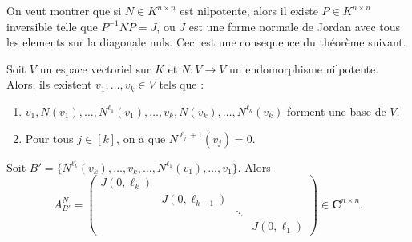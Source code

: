On veut montrer que si $N\in K^{n\times n}$ est nilpotente, alors il existe $P\in K^{n\times n}$ inversible telle que $P^{-1}NP=J$, ou $J$ est une forme normale de Jordan avec tous les elements sur la diagonale nuls. Ceci est une consequence du théorème suivant.
\begin{theorem}
Soit $V$ un espace vectoriel sur $K$ et $N:V\to V$ un endomorphisme nilpotente. Alors, ils existent $v_{1},\dots,v_{k}\in V$ tels que :
\begin{enumerate}
\item $v_{1},N(v_{1}),\dots,N^{\ell_{1}}(v_{1}),\dots,v_{k},N(v_{k}),\dots,N^{\ell _{k}}(v_{k})$ forment une base de $V$. 
\item Pour tous $j\in[k]$, on a que $N^{\ell _{j}+1}(v_{j})=0$.
\end{enumerate}
\end{theorem}
\begin{remark}
Soit $B'=\{ N^{\ell _{k}}(v_{k}),\dots,v_{k},\dots,N^{\ell_{1}}(v_{1}),\dots,v_{1} \}$. Alors
$$
A^{N}_{B'}=\begin{pmatrix}
J(0,\ell _{k}) \\
 & J(0,\ell _{k-1}) \\
 &  & \ddots \\
 &  &  & J(0,\ell_{1})
\end{pmatrix}\in \mathbf{C}^{n\times n}. 
$$
\end{remark}
